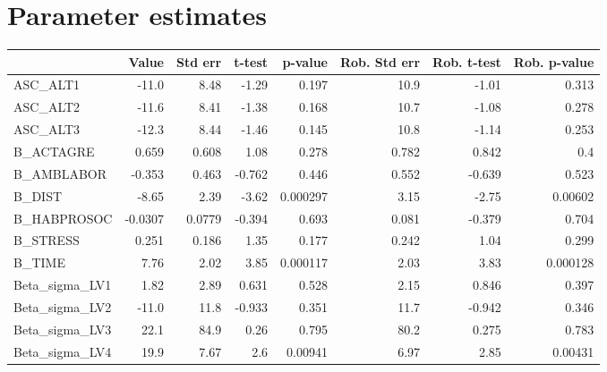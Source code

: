 \section{Parameter estimates}
\begin{tabular}{lrrrrrrr}
\toprule
{} &   Value &  Std err &  t-test &  p-value &  Rob. Std err &  Rob. t-test &  Rob. p-value \\
\midrule
ASC\_ALT1       &   -11.0 &     8.48 &   -1.29 &    0.197 &          10.9 &        -1.01 &         0.313 \\
ASC\_ALT2       &   -11.6 &     8.41 &   -1.38 &    0.168 &          10.7 &        -1.08 &         0.278 \\
ASC\_ALT3       &   -12.3 &     8.44 &   -1.46 &    0.145 &          10.8 &        -1.14 &         0.253 \\
B\_ACTAGRE      &   0.659 &    0.608 &    1.08 &    0.278 &         0.782 &        0.842 &           0.4 \\
B\_AMBLABOR     &  -0.353 &    0.463 &  -0.762 &    0.446 &         0.552 &       -0.639 &         0.523 \\
B\_DIST         &   -8.65 &     2.39 &   -3.62 & 0.000297 &          3.15 &        -2.75 &       0.00602 \\
B\_HABPROSOC    & -0.0307 &   0.0779 &  -0.394 &    0.693 &         0.081 &       -0.379 &         0.704 \\
B\_STRESS       &   0.251 &    0.186 &    1.35 &    0.177 &         0.242 &         1.04 &         0.299 \\
B\_TIME         &    7.76 &     2.02 &    3.85 & 0.000117 &          2.03 &         3.83 &      0.000128 \\
Beta\_sigma\_LV1 &    1.82 &     2.89 &   0.631 &    0.528 &          2.15 &        0.846 &         0.397 \\
Beta\_sigma\_LV2 &   -11.0 &     11.8 &  -0.933 &    0.351 &          11.7 &       -0.942 &         0.346 \\
Beta\_sigma\_LV3 &    22.1 &     84.9 &    0.26 &    0.795 &          80.2 &        0.275 &         0.783 \\
Beta\_sigma\_LV4 &    19.9 &     7.67 &     2.6 &  0.00941 &          6.97 &         2.85 &       0.00431 \\
\bottomrule
\end{tabular}

